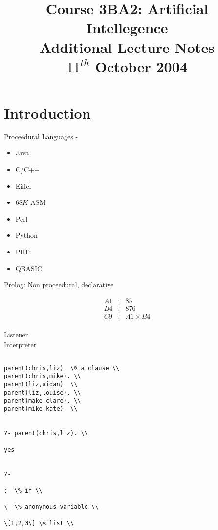 \documentclass[a4paper,12pt]{article}
\begin{document}
\title{Course 3BA2: Artificial Intellegence \\ Additional Lecture Notes \\ $11^{th}$ October 2004}

\maketitle

\section{Introduction}

Proceedural Languages - 

\begin{itemize}
\item Java
\item C/C++
\item Eiffel
\item $68K$ ASM
\item Perl
\item Python
\item PHP
\item QBASIC
\end{itemize}

Prolog: Non proceedural, declarative

\begin{eqnarray*}
A1 & : & 85 \\
B4 & : & 876 \\
C9 & : & A1 \times B4 \\
\end{eqnarray*}


Listener \\
Interpreter \\
 

\begin{lstlisting}

parent(chris,liz). \% a clause \\
parent(chris,mike). \\
parent(liz,aidan). \\
parent(liz,louise). \\
parent(make,clare). \\
parent(mike,kate). \\


?- parent(chris,liz). \\

yes


?-

:- \% if \\

\_ \% anonymous variable \\

\[1,2,3\] \% list \\

\end{lstlisting}
\end{document}
